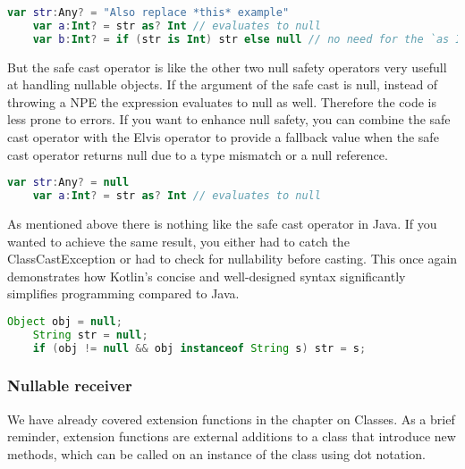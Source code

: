 \documentclass[a4paper, 11pt]{article}
\begin{document}
  \begin{lstlisting}[language=Kotlin,title={Usage of the safe cast operator in comparisopn to an if statement}]
    var str:Any? = "Also replace *this* example"
    var a:Int? = str as? Int // evaluates to null
    var b:Int? = if (str is Int) str else null // no need for the `as Int` here due to smart casting
  \end{lstlisting}
  But the safe cast operator is like the other two null safety operators very usefull at handling nullable objects. If the argument of the safe cast is null, instead of throwing a NPE the expression evaluates to null as well. Therefore the code is less prone to errors. If you want to enhance null safety, you can combine the safe cast operator with the Elvis operator to provide a fallback value when the safe cast operator returns null due to a type mismatch or a null reference.
  \begin{lstlisting}[language=Kotlin,title={Usage of the safe cast operator on a nullable value}]
    var str:Any? = null
    var a:Int? = str as? Int // evaluates to null
  \end{lstlisting}
  As mentioned above there is nothing like the safe cast operator in Java. If you wanted to achieve the same result, you either had to catch the ClassCastException or  had to check for nullability before casting. This once again demonstrates how Kotlin's concise and well-designed syntax significantly simplifies programming compared to Java.
  \begin{lstlisting}[language=Java,title={Functionality of safe call operator in java}]
    Object obj = null;
    String str = null;
    if (obj != null && obj instanceof String s) str = s;
  \end{lstlisting}

\subsubsection{Nullable receiver}
  We have already covered extension functions in the chapter on Classes. As a brief reminder, extension functions are external additions to a class that introduce new methods, which can be called on an instance of the class using dot notation.
\end{document}
